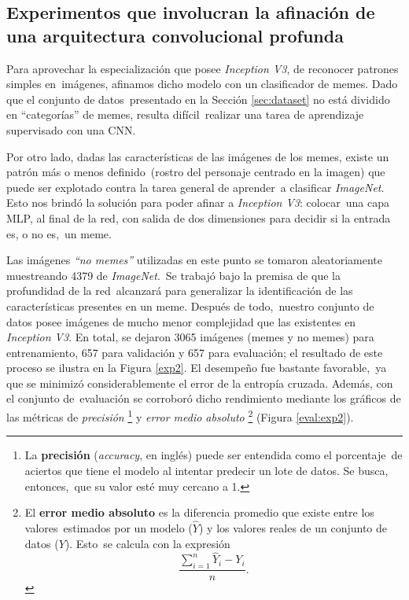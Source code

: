 \subsection{Experimentos que involucran la afinación de una arquitectura convolucional profunda}

\noindent
Para aprovechar la especialización que posee \emph{Inception V3}, de reconocer patrones simples en\
imágenes, afinamos dicho modelo con un clasificador de memes. Dado que el conjunto de datos\
presentado en la Sección \ref{sec:dataset} no está dividido en ``categorías'' de memes, resulta difícil\
realizar una tarea de aprendizaje supervisado con una CNN.\par
Por otro lado, dadas las características de las imágenes de los memes, existe un patrón más o menos definido\
(rostro del personaje centrado en la imagen) que puede ser explotado contra la tarea general de aprender\
a clasificar \emph{ImageNet}. Esto nos brindó la solución para poder afinar a \emph{Inception V3}: colocar\
una capa MLP, al final de la red, con salida de dos dimensiones para decidir si la entrada es, o no es,\
un meme.\par
Las imágenes \emph{``no memes''} utilizadas en este punto se tomaron aleatoriamente muestreando 4379 de \emph{ImageNet}.\
Se trabajó bajo la premisa de que la profundidad de la red\
alcanzará para generalizar la identificación de las características presentes en un meme. Después de todo,\
nuestro conjunto de datos posee imágenes de mucho menor complejidad que las existentes en \emph{Inception V3}.
En total, se dejaron 3065 imágenes (memes y no memes) para entrenamiento, 657 para validación y 657 para evaluación;
el resultado de este proceso se ilustra en la Figura \ref{exp2}. El desempeño fue bastante favorable,\
ya que se minimizó considerablemente el error de la entropía cruzada. Además, con el conjunto de\
evaluación se corroboró dicho rendimiento mediante los gráficos de las métricas de \emph{precisión}%
\footnote{
  La \textbf{precisión} (\emph{accuracy}, en inglés) puede ser entendida como el porcentaje\
  de aciertos que tiene el modelo al intentar predecir un lote de datos. Se busca, entonces,\
  que su valor esté muy cercano a 1.
} y \emph{error medio absoluto}%
\footnote{
  El \textbf{error medio absoluto} es la diferencia promedio que existe entre los valores\
  estimados por un modelo ($\hat{Y}$) y los valores reales de un conjunto de datos ($Y$). Esto\
  se calcula con la expresión
  \[\frac{\sum_{i=1}^n \hat{Y}_i - Y_i}{n}.\]
} (Figura \ref{eval:exp2}).

